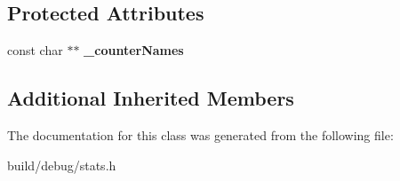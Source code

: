 \subsection*{Protected Attributes}
\begin{DoxyCompactItemize}
\item 
\hypertarget{classVectorStat_afadb16feba3a869e1e28a87cbb15f445}{const char $\ast$$\ast$ {\bfseries \-\_\-counter\-Names}}\label{classVectorStat_afadb16feba3a869e1e28a87cbb15f445}

\end{DoxyCompactItemize}
\subsection*{Additional Inherited Members}


The documentation for this class was generated from the following file\-:\begin{DoxyCompactItemize}
\item 
build/debug/stats.\-h\end{DoxyCompactItemize}
